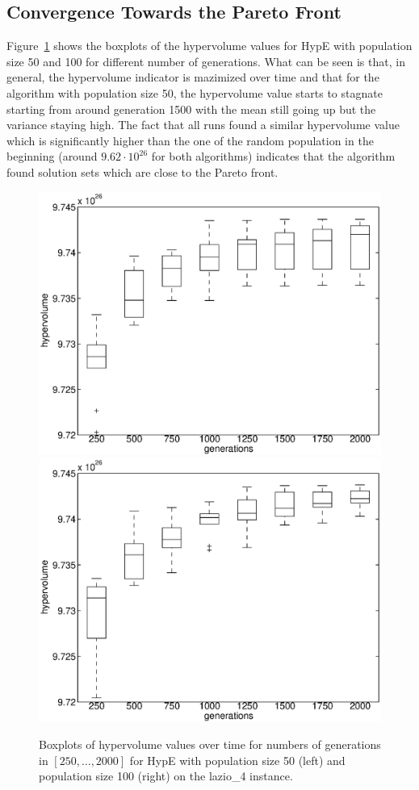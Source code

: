 \documentclass[preprint,12pt]{elsarticle}
\begin{document}
\subsection{Convergence Towards the Pareto Front}
Figure~\ref{fig:hypervolumeOverTime} shows the boxplots of the hypervolume values for HypE with population size 50 and 100 for different number of generations. What can be seen is that, in general, the hypervolume indicator is mazimized over time and that for the algorithm with population size 50, the hypervolume value starts to stagnate starting from around generation 1500 with the mean still going up but the variance staying high. The fact that all runs found a similar hypervolume value which is significantly higher than the one of the random population in the beginning (around $9.62\cdot 10^26$ for both algorithms) indicates that the algorithm found solution sets which are close to the Pareto front.


\begin{figure}
	\centering
	\includegraphics[width=0.48\columnwidth]{../experiments/randVsCost/hypervolumes/hypervolumeOverTime_50.eps}
	\hfill
	\includegraphics[width=0.48\columnwidth]{../experiments/randVsCost/hypervolumes/hypervolumeOverTime_100.eps}
	\caption{\label{fig:hypervolumeOverTime} Boxplots of hypervolume values over time for numbers of generations in $[250, \ldots, 2000]$ for HypE with population size 50 (left) and population size 100 (right) on the lazio\_4 instance.}
\end{figure}
\end{document}
